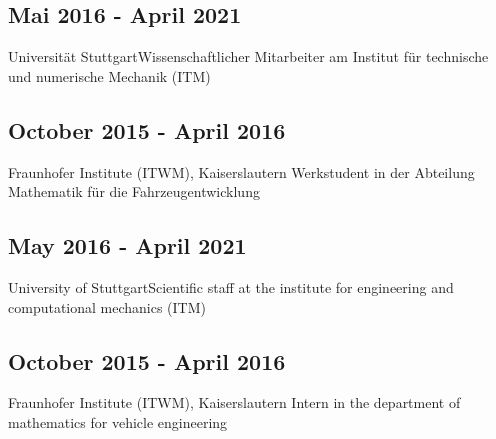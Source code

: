 \documentclass{mycv}
\begin{document}
{\rlap{\color{templateColor4}\rule[0mm]{\textwidth}{\ulinewidth}}}
\begin{paracol}{2}
    \switchcolumn
    {
        \subsection{Mai 2016 - April 2021}{Universit{\"a}t
        Stuttgart}{Wissenschaftlicher Mitarbeiter am Institut f{\"u}r
        technische und numerische Mechanik (ITM)}\\

        \subsection{October 2015 - April 2016}{Fraunhofer Institute (ITWM), Kaiserslautern}
            {Werkstudent in der Abteilung Mathematik für die Fahrzeugentwicklung}\\
    }
    {
        \subsection{May 2016 - April 2021}{University of Stuttgart}{Scientific staff at the institute for engineering and
            computational \quad\quad mechanics (ITM)}
        \subsection{October 2015 - April 2016}{Fraunhofer Institute (ITWM), Kaiserslautern}
            {Intern in the department of mathematics for vehicle engineering}\\
    }
    

\end{paracol}
\end{document}
